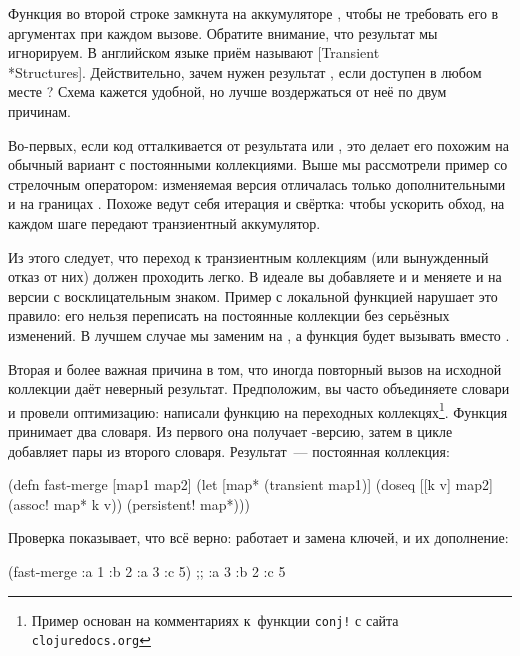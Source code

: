 Функция  во второй строке замкнута на аккумуляторе , чтобы не
требовать его в аргументах при каждом вызове. Обратите внимание, что результат
 мы игнорируем. В английском языке приём называют
[Transient\\*Structures].
Действительно, зачем нужен результат , если  доступен
в любом месте ? Схема кажется удобной, но лучше воздержаться
от неё по двум причинам.

Во-первых, если код отталкивается от результата  или ,
это делает его похожим на обычный вариант с постоянными коллекциями. Выше мы
рассмотрели пример со стрелочным оператором: изменяемая версия отличалась только
дополнительными  и  на
границах . Похоже ведут себя итерация и свёртка: чтобы
ускорить обход, на каждом шаге передают транзиентный аккумулятор.

Из этого следует, что переход к транзиентным коллекциям (или вынужденный отказ
от них) должен проходить легко. В идеале вы добавляете  и
 и меняете  и  на версии с
восклицательным знаком. Пример с локальной функцией  нарушает это
правило: его нельзя переписать на постоянные коллекции без серьёзных
изменений. В лучшем случае мы заменим  на , а функция
 будет вызывать  вместо .

Вторая и более важная причина в том, что иногда повторный вызов  на
исходной коллекции даёт неверный результат. Предположим, вы часто объединяете
словари и провели оптимизацию: написали функцию  на переходных
коллекцях\footnote{Пример основан на комментариях к~функции \texttt{conj!} с
  сайта \texttt{clo\-ju\-re\-docs.org}}. Функция принимает два словаря. Из
первого она получает -версию, затем в цикле добавляет пары из
второго словаря. Результат~--- постоянная коллекция:

\begin{clojure}
(defn fast-merge [map1 map2]
  (let [map* (transient map1)]
    (doseq [[k v] map2]
      (assoc! map* k v))
    (persistent! map*)))
\end{clojure}

Проверка показывает, что всё верно: работает и замена ключей, и их дополнение:

\begin{clojure}
(fast-merge {:a 1 :b 2} {:a 3 :c 5})
;; {:a 3 :b 2 :c 5}
\end{clojure}

